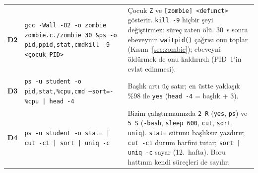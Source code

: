 \documentclass[11pt,a4paper]{article}
\newcommand{\cmd}[1]{\texttt{#1}}
\begin{document}
{\begin{longtable}{@{}p{0.6cm}>{\raggedright\arraybackslash}p{7.3cm}>{\raggedright\arraybackslash}p{7.6cm}@{}}
\textbf{D2} & \texttt{gcc -Wall -O2 -o zombie zombie.c}\newline \texttt{./zombie 30 \&}\newline \texttt{ps -o pid,ppid,stat,cmd}\newline \texttt{kill -9 <çocuk PID>} & Çocuk \texttt{Z} ve \texttt{[zombie] <defunct>} gösterir. \cmd{kill -9} hiçbir şeyi değiştirmez: süreç zaten ölü. $30$~s sonra ebeveynin \cmd{waitpid()} çağrısı onu toplar (Kısım~\ref{sec:zombie}); ebeveyni öldürmek de onu kaldırırdı (PID~1'in evlat edinmesi).\\
\textbf{D3} & \texttt{ps -u student -o pid,stat,\%cpu,cmd --sort=-\%cpu | head -4} & Başlık artı üç satır; en üstte yaklaşık \%98 ile \cmd{yes} (\texttt{head -4} = başlık + $3$).\\
\textbf{D4} & \texttt{ps -u student -o stat= | cut -c1 | sort | uniq -c} & Bizim çalıştırmamızda \texttt{2 R} (\cmd{yes}, \cmd{ps}) ve \texttt{5 S} (\texttt{-bash}, \texttt{sleep 600}, \cmd{cut}, \cmd{sort}, \cmd{uniq}). \texttt{stat=} sütunu başlıksız yazdırır; \cmd{cut -c1} durum harfini tutar; \cmd{sort | uniq -c} sayar (12.~hafta). Boru hattının kendi süreçleri de sayılır.\\
\bottomrule
\end{longtable}
}
\end{document}
